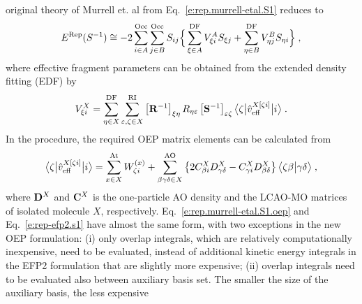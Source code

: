 original theory of Murrell et. al from Eq.~\eqref{e:rep.murrell-etal.S1}
reduces to
%
\begin{equation} \label{e:rep.murrell-etal.S1.oep}
    E^{\rm Rep}(S^{-1}) \cong 
 -2\sum_{i\in A}^{\rm Occ} \sum_{j\in B}^{\rm Occ}
               S_{ij} \Big\{
           \sum_{\xi \in A}^{\rm DF} V_{\xi i}^A S_{\xi j}
         + \sum_{\eta\in B}^{\rm DF} V_{\eta j}^B S_{\eta i}
                \Big\} \;,
\end{equation}
%
where 
effective fragment parameters
can be obtained 
from the extended density fitting\cite{Blasiak.Bednarska.Choluj.Bartkowiak.JCP.2019} (EDF)
by
%
\begin{equation} \label{e:rep.murrell-etal.S1.oep-edf}
            V_{\xi i}^X = \sum_{\eta\in X}^{\rm DF} 
                          \sum_{\varepsilon,\zeta\in X}^{\rm RI}
                          \left[ {\bf R}^{-1} \right]_{\xi\eta} R_{\eta\varepsilon} 
                          \left[ {\bf S}^{-1} \right]_{\varepsilon\zeta} 
                          \bigl\langle {\zeta} \bigl\lvert {\hat{v}_{\rm eff}^{X[\zeta i]}} \bigl\lvert {i} \bigr\rangle
                \;.
\end{equation}
%
In the procedure, the required OEP matrix elements can be calculated from
%
\begin{equation} \label{e:rep.murrell-etal.S1.oep-v}
   \bigl\langle {\zeta} \bigl\lvert {\hat{v}_{\rm eff}^{X[\zeta i]}} \bigl\lvert {i} \bigr\rangle
     = \sum_{x\in X}^{\rm At} W_{\zeta i}^{(x)} 
        + \sum_{\beta\gamma\delta\in X}^{\rm AO}
           \left\{ 
             2 C_{\beta i}^X D_{\gamma\delta}^X - C_{\gamma i}^X D_{\beta \delta}^X
           \right\}
           \bigl\langle {\zeta\beta} \bigl\lvert {\gamma\delta} \bigr\rangle \;,
\end{equation}
%
where ${\bf D}^X$ and ${\bf C}^X$ is the one\hyp{}particle AO density and
the LCAO\hyp{}MO matrices of isolated molecule $X$, respectively.
%
Eq.~\eqref{e:rep.murrell-etal.S1.oep} and Eq.~\eqref{e:rep-efp2.s1} have almost
the same form, with two exceptions in the new OEP formulation: 
(i) only overlap integrals, which are relatively computationally inexpensive,
need to be evaluated, instead of additional kinetic energy integrals in the EFP2
formulation that are slightly more expensive;
(ii) overlap integrals need to be evaluated also between
auxiliary basis set. The smaller the size of the auxiliary basis, the less expensive
